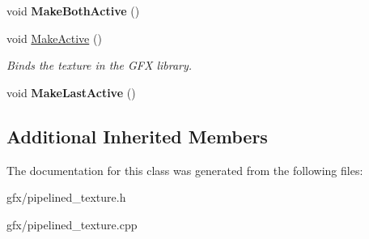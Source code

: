 \begin{DoxyCompactItemize}
\item 
void {\bfseries Make\+Both\+Active} ()\hypertarget{classPipelinedTexture_affef4c058fbb1042695c7155ac6ddd9a}{}\label{classPipelinedTexture_affef4c058fbb1042695c7155ac6ddd9a}

\item 
void \hyperlink{classPipelinedTexture_a31598a497eaab50be2402ee4d9610e50}{Make\+Active} ()\hypertarget{classPipelinedTexture_a31598a497eaab50be2402ee4d9610e50}{}\label{classPipelinedTexture_a31598a497eaab50be2402ee4d9610e50}

\begin{DoxyCompactList}\small\item\em Binds the texture in the G\+FX library. \end{DoxyCompactList}\item 
void {\bfseries Make\+Last\+Active} ()\hypertarget{classPipelinedTexture_ae74907dbed3e2f7b8a4b7ce23f7960a9}{}\label{classPipelinedTexture_ae74907dbed3e2f7b8a4b7ce23f7960a9}

\end{DoxyCompactItemize}
\subsection*{Additional Inherited Members}


The documentation for this class was generated from the following files\+:\begin{DoxyCompactItemize}
\item 
gfx/pipelined\+\_\+texture.\+h\item 
gfx/pipelined\+\_\+texture.\+cpp\end{DoxyCompactItemize}
